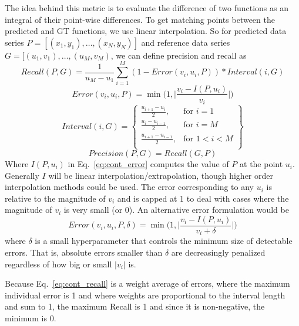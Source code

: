 \documentclass[a4paper,11pt]{scrartcl}
\begin{document}
The idea behind this metric is to evaluate the difference of two functions as an integral of their point-wise differences.
To get matching points between the predicted and GT functions, we use linear interpolation.
So for predicted data series $P = [(x_1, y_1), \dots, (x_N, y_N)]$ and reference data series  $G = [(u_1, v_1), \dots, (u_M, v_M)$, we can define precision and recall as
\begin{equation} \label{eq:cont_recall}
Recall(P, G) = \frac{1}{u_M - u_1}
\sum_{i=1}^M (1 - Error(v_i, u_i, P)) * Interval(i, G)  
\end{equation}
\begin{equation} \label{eq:cont_error}
 Error(v_i, u_i, P) = \min \Big(1, \Big| \frac{v_i - I(P, u_i)}{v_i} \Big|\Big)
\end{equation}
\begin{equation} \label{eq:cont_interval}
Interval(i, G) = \left\{\begin{array}{lr}
				 \frac{u_{i+1} - u_{i}}{2}, & \text{for } i = 1 \\
				 \frac{u_{i} - u_{i-1}}{2}, & \text{for } i = M \\
				 \frac{u_{i+1} - u_{i-1}}{2} , & \text{for } 1 < i < M \\
				 \end{array}\right\}
\end{equation}
\begin{equation} \label{eq:cont_precision}
Precision(P, G) = Recall(G, P)
\end{equation}
Where $I(P, u_i)$ in Eq.~\ref{eq:cont_error} computes the value of $P$ at the point $u_i$.
Generally $I$ will be linear interpolation/extrapolation, though higher order interpolation methods could be used.
The error corresponding to any $u_i$ is relative to the magnitude of $v_i$ and is capped at 1 to deal with cases where the magnitude of $v_i$ is very small (or 0).
An alternative error formulation would be
\begin{equation} \label{eq:cont_error_alt}
 Error(v_i, u_i, P, \delta) = \min \Big(1, \Big| \frac{v_i - I(P, u_i)}{v_i + \delta} \Big|\Big)
\end{equation}
where $\delta$ is a small hyperparameter that controls the minimum size of detectable errors.
That is, absolute errors smaller than $\delta$ are decreasingly penalized regardless of how big or small $|v_i|$ is.

Because Eq.~\ref{eq:cont_recall} is a weight average of errors, where the maximum individual error is 1 and where weights are proportional to the interval length and sum to 1, the maximum Recall is 1 and since it is non-negative, the minimum is 0.
\end{document}
